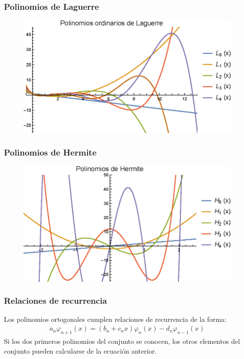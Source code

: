 \documentclass[12pt]{beamer}
\begin{document}
\begin{frame}
\frametitle{Polinomios de Laguerre}
\begin{figure}
  \centering
  \includegraphics[scale=0.9]{Imagenes/plot_Laguerre_01.eps}
\end{figure}
\end{frame}
\begin{frame}
\frametitle{Polinomios de Hermite}
\begin{figure}
  \centering
  \includegraphics[scale=0.9]{Imagenes/plot_Hermite_01.eps}
\end{figure}
\end{frame}
\begin{frame}
\frametitle{Relaciones de recurrencia}
Los polinomios ortogonales cumplen relaciones de recurrencia de la forma:
\begin{align*}
a_{n} \varphi_{n+1} (x) = (b_{n} + c_{n} x) \varphi_{n} (x) - d_{n} \varphi_{n-1} (x) 
\end{align*}
Si los dos primeros polinomios del conjunto se conocen, los otros elementos del conjunto pueden calcularse de la ecuación anterior. 
\end{frame}
\end{document}
